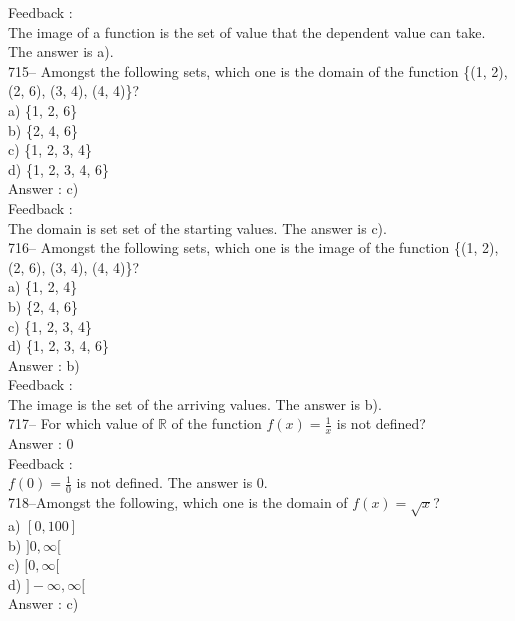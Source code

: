 \documentclass[letterpaper, 12pt]{article}
\begin{document}
Feedback : \\
The image of a function is the set of value that the dependent value can take.
The answer is a).\\

715--  Amongst the following sets, which one is the domain of the function \{(1, 2), (2, 6), (3, 4), (4, 4)\}?\\
a) \{1, 2, 6\}\\
b) \{2, 4, 6\}\\
c) \{1, 2, 3, 4\}\\
d) \{1, 2, 3, 4, 6\}\\

Answer : c)\\

Feedback : \\
The domain is set set of the starting values.  
The answer is c).\\

716--  Amongst the following sets, which one is the image of the function \{(1, 2), (2, 6), (3, 4), (4, 4)\}?\\
a) \{1, 2, 4\}\\
b) \{2, 4, 6\}\\
c) \{1, 2, 3, 4\}\\
d) \{1, 2, 3, 4, 6\}\\

Answer : b)\\

Feedback : \\
The image is the set of the arriving values. The answer is b).\\

717-- For which value of $\mathbb{R}$ of the function $f(x)=\frac{1}{x}$
is not defined?\\

Answer : 0\\

Feedback :\\
$f(0)=\frac{1}{0}$ is not defined.  The answer is 0.\\

718--Amongst the following, which one is the domain of
$f(x)=\sqrt{x}$?\\
a) $[0,100]$\\
b) $]0,\infty[$\\
c) $[0,\infty[$\\
d) $]-\infty, \infty[$\\

Answer : c)\\
\end{document}
